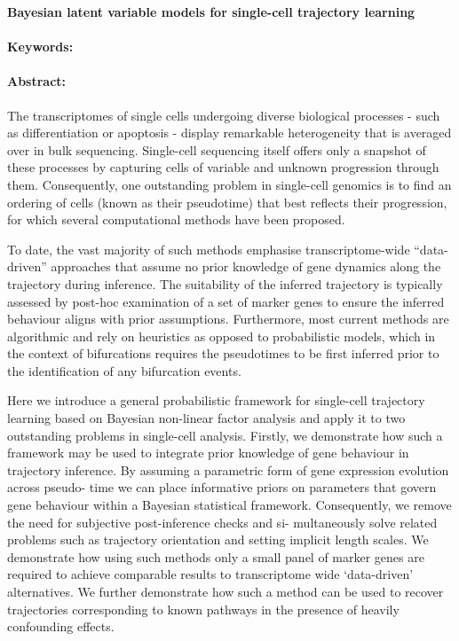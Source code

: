 \noindent
\large {\bf Bayesian latent variable models for single-cell trajectory learning} 


\normalsize 


\noindent \paragraph{Keywords:} 

\noindent \paragraph{Abstract:} 

The transcriptomes of single cells undergoing diverse biological processes - such as differentiation or
apoptosis - display remarkable heterogeneity that is averaged over in bulk sequencing. Single-cell
sequencing itself offers only a snapshot of these processes by capturing cells of variable and unknown
progression through them. Consequently, one outstanding problem in single-cell genomics is to find
an ordering of cells (known as their pseudotime) that best reflects their progression, for which several
computational methods have been proposed.

To date, the vast majority of such methods emphasise transcriptome-wide ``data-driven'' approaches
that assume no prior knowledge of gene dynamics along the trajectory during inference. The suitability
of the inferred trajectory is typically assessed by post-hoc examination of a set of marker genes to
ensure the inferred behaviour aligns with prior assumptions. Furthermore, most current methods
are algorithmic and rely on heuristics as opposed to probabilistic models, which in the context of
bifurcations requires the pseudotimes to be first inferred prior to the identification of any bifurcation
events.


Here we introduce a general probabilistic framework for single-cell trajectory learning based on Bayesian
non-linear factor analysis and apply it to two outstanding problems in single-cell analysis. Firstly,
we demonstrate how such a framework may be used to integrate prior knowledge of gene behaviour
in trajectory inference. By assuming a parametric form of gene expression evolution across pseudo-
time we can place informative priors on parameters that govern gene behaviour within a Bayesian
statistical framework. Consequently, we remove the need for subjective post-inference checks and si-
multaneously solve related problems such as trajectory orientation and setting implicit length scales.
We demonstrate how using such methods only a small panel of marker genes are required to achieve
comparable results to transcriptome wide ‘data-driven’ alternatives. We further demonstrate how
such a method can be used to recover trajectories corresponding to known pathways in the presence
of heavily confounding effects.

